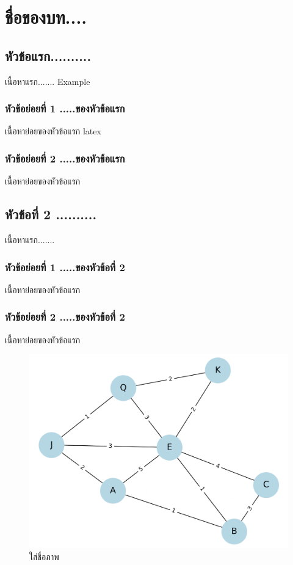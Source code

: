 \chapter{ชื่อของบท....}

\section{หัวข้อแรก..........}
เนื้อหาแรก....... \Gls{Example}

\subsection{หัวข้อย่อยที่ 1 .....ของหัวข้อแรก}
เนื้อหาย่อยของหัวข้อแรก latex \textcite{haverbeke2018eloquent}

\subsection{หัวข้อย่อยที่ 2 .....ของหัวข้อแรก}
เนื้อหาย่อยของหัวข้อแรก


\section{หัวข้อที่ 2 ..........}
เนื้อหาแรก.......

\subsection{หัวข้อย่อยที่ 1 .....ของหัวข้อที่ 2}
เนื้อหาย่อยของหัวข้อแรก

\subsection{หัวข้อย่อยที่ 2 .....ของหัวข้อที่ 2}
เนื้อหาย่อยของหัวข้อแรก


\begin{figure}
    \centering
    \includegraphics[width=0.5\linewidth]{author//images/graph.png}
    \caption{ใส่ชื่อภาพ}
    \label{fig:enter-label}
\end{figure}
